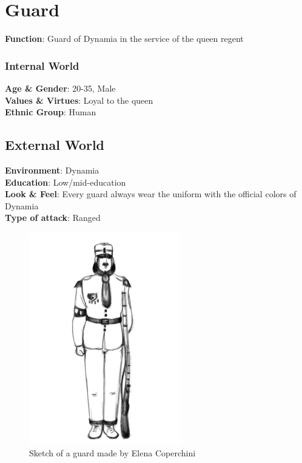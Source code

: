 \section{Guard}

\begin{minipage}{0.5\textwidth}
\textbf{Function}: Guard of Dynamia in the service of the queen regent

\subsubsection{Internal World}

\textbf{Age \& Gender}: 20-35, Male \\
\textbf{Values \& Virtues}: Loyal to the queen\\
\textbf{Ethnic Group}: Human

\subsection{External World}
\textbf{Environment}: Dynamia \\
\textbf{Education}: Low/mid-education \\
\textbf{Look \& Feel}: Every guard always wear the uniform with the official colors of Dynamia \\
\textbf{Type of attack}: Ranged \\
\end{minipage}%
%
\hfill\begin{minipage}{0.4\textwidth}
  \begin{figure}[H]
  \includegraphics{Images/Characters/guard_portrait}
  \caption{Sketch of a guard made by Elena Coperchini}
  \end{figure}
\end{minipage}


